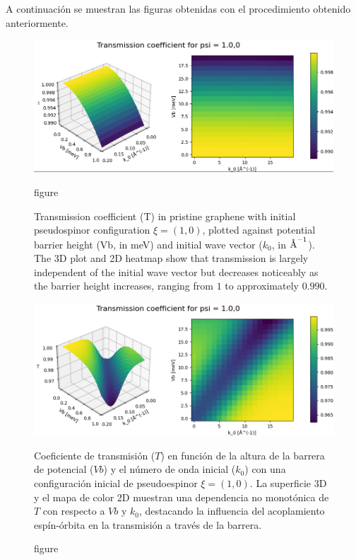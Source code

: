     A continuación se muestran las figuras obtenidas con el procedimiento obtenido anteriormente.

    \begin{figure}[h!]
        \centering
        \begin{minipage}[t]{0.48\textwidth}
            \centering
            \includegraphics[width=\textwidth]{../assets/images/No-Rashba/TCoefficient(1.0,0)xalpha=0beta=0}
            \caption{figure}{
Transmission coefficient (T) in pristine graphene with initial pseudospinor configuration $\xi = (1, 0)$, plotted against potential barrier height (Vb, in meV) and initial wave vector ($k_0$, in $\textup{\AA}^{-1}$). The 3D plot and 2D heatmap show that transmission is largely independent of the initial wave vector but decreases noticeably as the barrier height increases, ranging from $1$ to approximately $0.990$.
}
            \label{fig:noRashba}
        \end{minipage}
        \hfill
        \begin{minipage}[t]{0.48\textwidth}
            \centering
            \includegraphics[width=\textwidth]{../assets/images/Rashba/TCoefficient(1.0,0)xalpha=0.2beta=-0.2}
            \caption{figure}{
Coeficiente de transmisión ($T$) en función de la altura de la barrera de potencial ($Vb$) y el número de onda inicial ($k_0$) con una configuración inicial de pseudoespinor $\xi = (1, 0)$. La superficie 3D y el mapa de color 2D muestran una dependencia no monotónica de $T$ con respecto a $Vb$ y $k_0$, destacando la influencia del acoplamiento espín-órbita en la transmisión a través de la barrera.
}
            \label{fig:rashba}
        \end{minipage}
    \end{figure}

